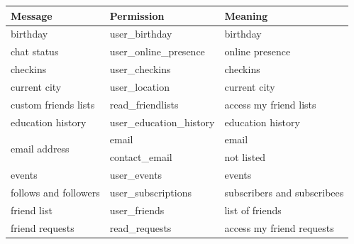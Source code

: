 \documentclass{sig-alternate}
\begin{document}
{\begin{table}[h!]
\begin{tabular}{|l|l|l|}
    \textbf{Message}                      & \textbf{Permission}         & \textbf{Meaning} \cite{fbpermissions}                                                                            \\ \hline\hline
    birthday                              & user\_birthday              & birthday                                                                                    \\ \hline
    chat status                           & user\_online\_presence      & online presence                                                                             \\ \hline
    checkins                              & user\_checkins              & checkins                                                                                    \\ \hline
    current city                          & user\_location              & current city                                                                                \\ \hline
    custom friends lists                  & read\_friendlists           & access my friend lists                                                                      \\ \hline
    education history                     & user\_education\_history    & education history                                                                           \\ \hline
    \multirow{2}{*}{email address}        & email                       & email                                                                                       \\ \cline{2-3} 
    & contact\_email              & not listed                                                                                  \\ \hline
    events                                & user\_events                & events                                                                                      \\ \hline
    follows and followers                 & user\_subscriptions         & subscribers and subscribees                                                                 \\ \hline
    friend list                           & user\_friends               & list of friends                                                                             \\ \hline
    friend requests                       & read\_requests              & access my friend requests                                                                   \\ \hline

\end{tabular}
\end{table}}
\end{document}
